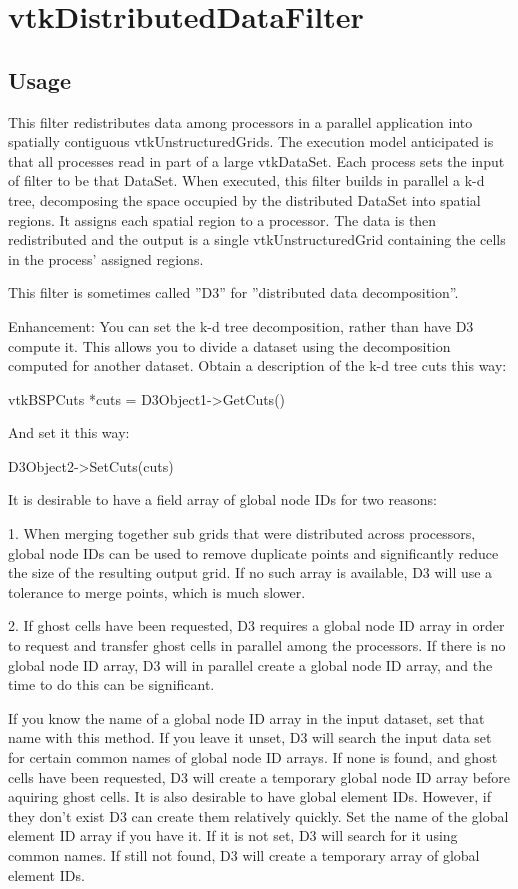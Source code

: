 \section{vtkDistributedDataFilter}

\subsection{Usage}

 This filter redistributes data among processors in a parallel
 application into spatially contiguous vtkUnstructuredGrids.
 The execution model anticipated is that all processes read in
 part of a large vtkDataSet. Each process sets the input of
 filter to be that DataSet. When executed, this filter builds
 in parallel a k-d tree, decomposing the space occupied by the
 distributed DataSet into spatial regions.  It assigns each
 spatial region to a processor.  The data is then redistributed
 and the output is a single vtkUnstructuredGrid containing the
 cells in the process' assigned regions.

 This filter is sometimes called ''D3'' for ''distributed data decomposition''.

 Enhancement: You can set the k-d tree decomposition, rather than
 have D3 compute it.  This allows you to divide a dataset using
 the decomposition computed for another dataset.  Obtain a description
 of the k-d tree cuts this way:

    vtkBSPCuts *cuts = D3Object1->GetCuts()

 And set it this way:

    D3Object2->SetCuts(cuts) 

    It is desirable to have a field array of global node IDs
    for two reasons:

    1. When merging together sub grids that were distributed
    across processors, global node IDs can be used to remove
    duplicate points and significantly reduce the size of the
    resulting output grid.  If no such array is available,
    D3 will use a tolerance to merge points, which is much
    slower.

    2. If ghost cells have been requested, D3 requires a
    global node ID array in order to request and transfer
    ghost cells in parallel among the processors.  If there
    is no global node ID array, D3 will in parallel create
    a global node ID array, and the time to do this can be
    significant.
    
    If you know the name of a global node ID array in the input
    dataset, set that name with this method.  If you leave
    it unset, D3 will search the input data set for certain
    common names of global node ID arrays.  If none is found,
    and ghost cells have been requested, D3 will create a
    temporary global node ID array before aquiring ghost cells.
   It is also desirable to have global element IDs.  However,
   if they don't exist D3 can create them relatively quickly.
   Set the name of the global element ID array if you have it.
   If it is not set, D3 will search for it using common names.
   If still not found, D3 will create a temporary array of
   global element IDs.


